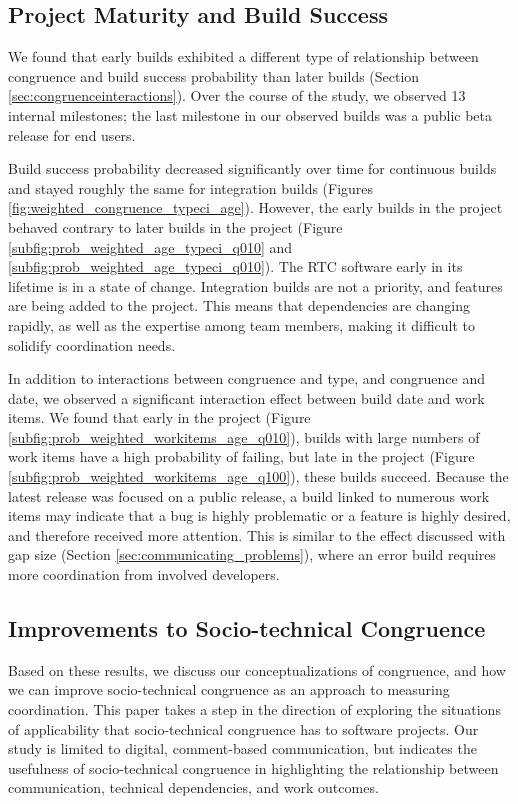 \subsection{Project Maturity and Build Success}
We found that early builds exhibited a different type of relationship between congruence and build success probability than later builds (Section \ref{sec:congruenceinteractions}). Over the course of the study, we observed 13 internal milestones; the last milestone in our observed builds was a public beta release for end users.

Build success probability decreased significantly over time for continuous builds and stayed roughly the same for integration builds (Figures \ref{fig:weighted_congruence_typeci_age}).
However, the early builds in the project behaved contrary to later builds in the project (Figure \ref{subfig:prob_weighted_age_typeci_q010} and \ref{subfig:prob_weighted_age_typeci_q010}). The RTC software early in its lifetime is in a state of change. Integration builds are not a priority, and features are being added to the project. This means that dependencies are changing rapidly, as well as the expertise among team members, making it difficult to solidify coordination needs.

In addition to interactions between congruence and type, and congruence and date, we observed a significant interaction effect between build date and work items.
We found that early in the project (Figure \ref{subfig:prob_weighted_workitems_age_q010}), builds with large numbers of work items have a high probability of failing, but late in the project (Figure \ref{subfig:prob_weighted_workitems_age_q100}), these builds succeed. Because the latest release was focused on a public release, a build linked to numerous work items may indicate that a bug is highly problematic or a feature is highly desired, and therefore received more attention. This is similar to the effect discussed with gap size (Section \ref{sec:communicating_problems}), where an error build requires more coordination from involved developers.


\subsection{Improvements to Socio-technical Congruence}
\label{sec:improvements}
Based on these results, we discuss our conceptualizations of congruence, and how we can improve socio-technical congruence as an approach to measuring coordination. This paper takes a step in the direction of exploring the situations of applicability that socio-technical congruence has to software projects. Our study is limited to digital, comment-based communication, but indicates the usefulness of socio-technical congruence in highlighting the relationship between communication, technical dependencies, and work outcomes.

